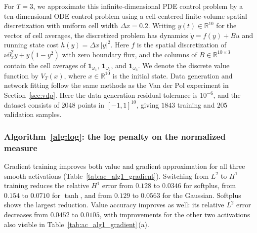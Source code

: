 \documentclass[11pt]{amsart}
\theoremstyle{definition}
\theoremstyle{remark}
\begin{document}
For $T=3$, we approximate this infinite-dimensional PDE control problem by
a ten-dimensional ODE control problem using a cell-centered finite-volume
spatial discretization \cite[Section~4.1]{gallouet2000error}
with uniform cell width $\Delta x=0.2$.
Writing $y(t)\in\mathbb R^{10}$ for the vector of cell averages, the
discretized problem has dynamics $\dot y=f(y)+Bu$ and running state cost
$h(y)=\Delta x\,|y|^2$.
Here $f$ is the spatial discretization of
$\nu\partial_x^2y+y(1-y^2)$ with zero boundary flux, and the columns of
$B\in\mathbb R^{10\times3}$ contain the cell averages of
$\mathbf{1}_{\omega_1}$, $\mathbf{1}_{\omega_2}$, and
$\mathbf{1}_{\omega_3}$.
We denote the discrete value function by $V_T(x)$, where
$x\in\mathbb R^{10}$ is the initial state.
Data generation and network fitting follow the same methods as the
Van der Pol experiment in Section~\ref{sec:vdp}.
Here the data-generation residual tolerance
is $10^{-6}$, and the dataset consists of $2048$ points in
$[-1,1]^{10}$, giving $1843$ training and $205$ validation samples.

\subsubsection*{Algorithm~\ref{alg:log}: the log penalty on the normalized measure}

Gradient training improves both value and gradient approximation for all
three smooth activations (Table~\ref{tab:ac_alg1_gradient}). Switching from
$L^2$ to $H^1$ training reduces the relative $H^1$ error from $0.128$ to
$0.0346$ for softplus, from $0.154$ to $0.0710$ for $\tanh$, and from
$0.129$ to $0.0563$ for the Gaussian. Softplus shows the largest reduction.
Value accuracy improves as well: its relative
$L^2$ error decreases from $0.0452$ to $0.0105$, with improvements for the
other two activations also visible in Table~\ref{tab:ac_alg1_gradient}\,(a).
\end{document}
